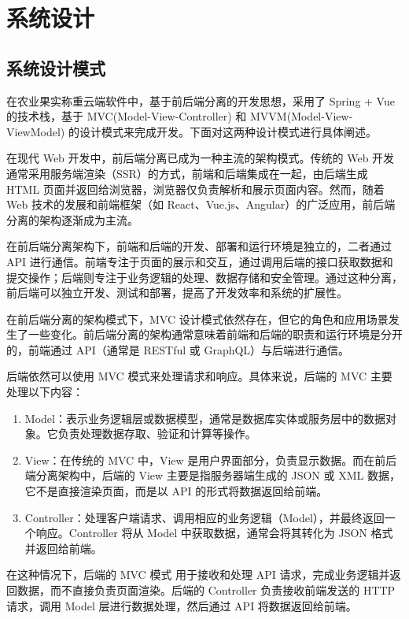 \chapter{系统设计}

\section{系统设计模式}

在农业果实称重云端软件中，基于前后端分离的开发思想，采用了 Spring + Vue 的技术栈，基于 MVC(Model-View-Controller) 和 MVVM(Model-View-ViewModel) 的设计模式来完成开发。下面对这两种设计模式进行具体阐述。

在现代 Web 开发中，前后端分离已成为一种主流的架构模式。传统的 Web 开发通常采用服务端渲染（SSR）的方式，前端和后端集成在一起，由后端生成 HTML 页面并返回给浏览器，浏览器仅负责解析和展示页面内容。然而，随着 Web 技术的发展和前端框架（如 React、Vue.js、Angular）的广泛应用，前后端分离的架构逐渐成为主流。

在前后端分离架构下，前端和后端的开发、部署和运行环境是独立的，二者通过 API 进行通信。前端专注于页面的展示和交互，通过调用后端的接口获取数据和提交操作；后端则专注于业务逻辑的处理、数据存储和安全管理。通过这种分离，前后端可以独立开发、测试和部署，提高了开发效率和系统的扩展性。

在前后端分离的架构模式下，MVC 设计模式依然存在，但它的角色和应用场景发生了一些变化。前后端分离的架构通常意味着前端和后端的职责和运行环境是分开的，前端通过 API（通常是 RESTful 或 GraphQL）与后端进行通信。

后端依然可以使用 MVC 模式来处理请求和响应。具体来说，后端的 MVC 主要处理以下内容：
\begin{enumerate}
    \item Model：表示业务逻辑层或数据模型，通常是数据库实体或服务层中的数据对象。它负责处理数据存取、验证和计算等操作。
    \item View：在传统的 MVC 中，View 是用户界面部分，负责显示数据。而在前后端分离架构中，后端的 View 主要是指服务器端生成的 JSON 或 XML 数据，它不是直接渲染页面，而是以 API 的形式将数据返回给前端。
    \item Controller：处理客户端请求、调用相应的业务逻辑（Model），并最终返回一个响应。Controller 将从 Model 中获取数据，通常会将其转化为 JSON 格式并返回给前端。
\end{enumerate}

在这种情况下，后端的 MVC 模式 用于接收和处理 API 请求，完成业务逻辑并返回数据，而不直接负责页面渲染。后端的 Controller 负责接收前端发送的 HTTP 请求，调用 Model 层进行数据处理，然后通过 API 将数据返回给前端。

